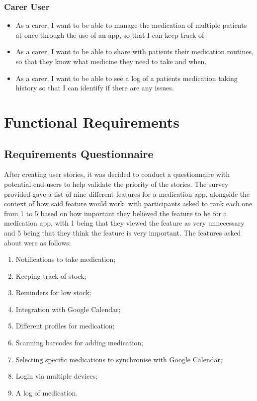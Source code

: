 \documentclass{l4proj}
\begin{document}
\subsubsection{Carer User}
\begin{itemize}
    \item As a carer, I want to be able to manage the medication of multiple patients at once through the use of an app, so that I can keep track of 
    \item As a carer, I want to be able to share with patients their medication routines, so that they know what medicine they need to take and when. 
    \item As a carer, I want to be able to see a log of a patients medication taking history so that I can identify if there are any issues. 
\end{itemize}

\section{Functional Requirements}

\subsection{Requirements Questionnaire}

After creating user stories, it was decided to conduct a questionnaire with potential end-users to help validate the priority of the stories. The survey provided gave a list of nine different features for a medication app, alongside the context of how said feature would work, with participants asked to rank each one from 1 to 5 based on how important they believed the feature to be for a medication app, with 1 being that they viewed the feature as very unnecessary and 5 being that they think the feature is very important. The features asked about were as follows:
\begin{enumerate}
    \item Notifications to take medication;
    \item Keeping track of stock;
    \item Reminders for low stock;
    \item Integration with Google Calendar;
    \item Different profiles for medication;
    \item Scanning barcodes for adding medication;
    \item Selecting specific medications to synchronise with Google Calendar;
    \item Login via multiple devices;
    \item A log of medication.
\end{enumerate}
\end{document}
